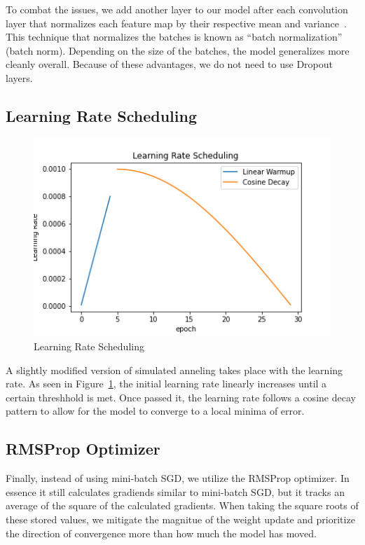 \documentclass[conference]{IEEEtran}
\begin{document}
To combat the issues, we add another layer to our model after each convolution
layer that normalizes each feature map by their respective mean and
variance~\cite{batch_norm_paper}. This technique that normalizes the batches is
known as ``batch normalization'' (batch norm). Depending on the size of the
batches, the model generalizes more cleanly overall. Because of these
advantages, we do not need to use Dropout layers.

\subsection{Learning Rate Scheduling}

\begin{figure}[H]
    \centering
    \includegraphics[width=0.8\linewidth]{figures/learning_rate_scheduling.png}
    \caption{Learning Rate Scheduling}\label{fig:learning_rate_scheduling}
\end{figure}

A slightly modified version of simulated anneling takes place with the learning
rate. As seen in Figure~\ref{fig:learning_rate_scheduling}, the initial learning
rate linearly increases until a certain threshhold is met. Once passed it, the
learning rate follows a cosine decay pattern to allow for the model to converge
to a local minima of error.

\subsection{RMSProp Optimizer}

Finally, instead of using mini-batch SGD, we utilize the RMSProp optimizer. In
essence it still calculates gradiends similar to mini-batch SGD, but it tracks an
average of the square of the calculated gradients. When taking the square roots
of these stored values, we mitigate the magnitue of the weight update and
prioritize the direction of convergence more than how much the model has moved.
\end{document}
